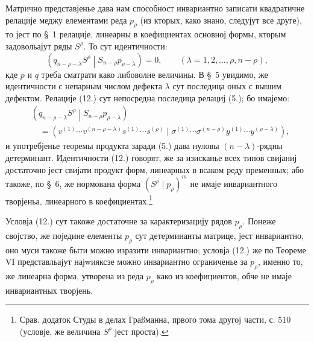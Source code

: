 \documentclass[11pt]{article}
\newcommand{\pair}[2]{\left(#1\middle|#2\right)}
\begin{document}
Матрично представјенье дава нам способност инвариантно записати квадратичне релације меджу елементами реда $p_\rho$ (из кторых, како знано, следујут все друге), то јест по \S\ 1 релације, линеарны в коефициентах основној формы, кторым задовольајут ряды $S^\rho$. То сут идентичности:
\begin{equation}
 \pair{q_{n-\rho-\lambda}S^\rho}{S_{n-\rho}p_{\rho-\lambda}}=0,
 \qquad (\lambda=1,2,\ldots,\rho,n-\rho),
\tag{12}
\end{equation}
кде $p$ и $q$ треба сматрати како либоволне величины. В \S\ 5 увидимо, же идентичности с непарным числом дефекта $\lambda$ сут последица оных с вышим дефектом. Релације (12.) сут непосредна последица релациј (5.); бо имајемо:
\[
\begin{aligned}
&\pair{q_{n-\rho-\lambda}S^\rho}{S_{n-\rho}p_{\rho-\lambda}}\\
&\quad
=(v^{(1)}\cdots v^{(n-\rho-\lambda)}s^{(1)}\cdots s^{(\rho)}
\mid \sigma^{(1)}\cdots\sigma^{(n-\rho)}y^{(1)}\cdots y^{(\rho-\lambda)}),
\end{aligned}
\]
и употребјенье теоремы продукта заради (5.) дава нуловы $(n-\lambda)$-рядны детерминант. Идентичности (12.) говорят, же за изисканье всех типов свијаниј достаточно јест свијати продукт форм, линеарных в всаком реду пременных; або такоже, по \S\ 6, же нормована форма $(S^\rho\mid p_\rho)^m$ не имаје инвариантного творјеньа, линеарного в коефициентах.\footnote{Срав. додаток Студы в делах Граßманна, првого тома другој части, с. 510 (условје, же величина $S^\rho$ јест проста).}

Условја (12.) сут такоже достаточне за карактеризацију рядов $p_\rho$. Понеже својство, же поједине елементы $p_\rho$ сут детерминанты матрице, јест инвариантно, оно муси такоже быти можно изразити инвариантно; условја (12.) же по Теореме VI представльајут најwияксзе можно инвариантно ограниченье за $p_\rho$, именно то, же линеарна форма, утворена из реда $p_\rho$ како из коефициентов, обче не имаје инвариантных творјень.
\end{document}
